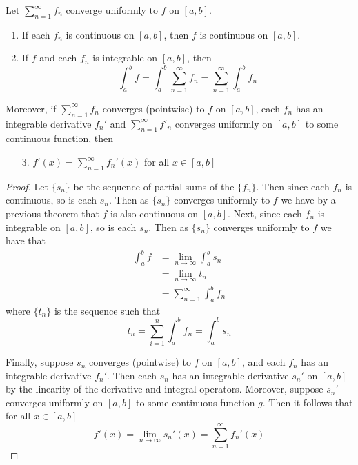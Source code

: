 \begin{corollary}
    Let $\sum\limits_{n=1}^{\infty}f_n$ converge uniformly to $f$ on $[a,b]$. \begin{enumerate}
        \item If each $f_n$ is continuous on $[a,b]$, then $f$ is continuous on $[a,b]$.
        \item If $f$ and each $f_n$ is integrable on $[a,b]$, then \begin{equation*}
                \int_a^bf = \int_a^b\sum_{n=1}^{\infty}f_n = \sum\limits_{n=1}^{\infty}\int_a^bf_n
        \end{equation*}
    \end{enumerate}
    Moreover, if $\sum\limits_{n=1}^{\infty}f_n$ converges (pointwise) to $f$ on $[a,b]$, each $f_n$ has an integrable derivative $f_n'$ and $\sum\limits_{n=1}^{\infty}f'_n$ converges uniformly on $[a,b]$ to some continuous function, then \begin{enumerate}
        \item[3.] $f'(x) = \sum\limits_{n=1}^{\infty}f_n'(x)$   for all $x \in [a,b]$
    \end{enumerate}
\end{corollary}
\begin{proof}
    Let $\{s_n\}$ be the sequence of partial sums of the $\{f_n\}$. Then since each $f_n$ is continuous, so is each $s_n$. Then as $\{s_n\}$ converges uniformly to $f$ we have by a previous theorem that $f$ is also continuous on $[a,b]$. Next, since each $f_n$ is integrable on $[a,b]$, so is each $s_n$. Then as $\{s_n\}$ converges uniformly to $f$ we have that \begin{align*}
        \int_a^bf &= \lim\limits_{n\rightarrow \infty}\int_a^bs_n \\
        &= \lim\limits_{n\rightarrow\infty}t_n \\
        &= \sum\limits_{n=1}^{\infty}\int_a^bf_n
    \end{align*}
    where $\{t_n\}$ is the sequence such that \begin{equation*}
        t_n = \sum\limits_{i=1}^n\int_a^bf_n = \int_a^bs_n
    \end{equation*}

    Finally, suppose $s_n$ converges (pointwise) to $f$ on $[a,b]$, and each $f_n$ has an integrable derivative $f_n'$. Then each $s_n$ has an integrable derivative $s_n'$ on $[a,b]$ by the linearity of the derivative and integral operators. Moreover, suppose $s_n'$ converges uniformly on $[a,b]$ to some continuous function $g$. Then it follows that for all $x \in [a,b]$ \begin{equation*}
        f'(x) = \lim\limits_{n\rightarrow \infty}s_n'(x) = \sum\limits_{n=1}^{\infty}f_n'(x)
    \end{equation*}
\end{proof}

